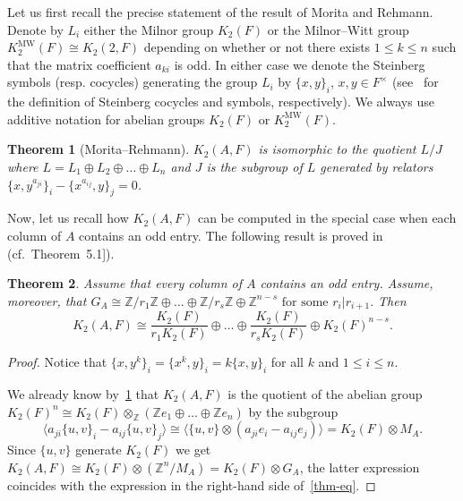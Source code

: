 \documentclass[oneside, 10pt]{amsart}
\theoremstyle{plain}
\newtheorem{thm}{Theorem}
\theoremstyle{remark}
\theoremstyle{definition}
\newcommand{\K}{K_2}
\newcommand{\Kmw}{K^{\mathrm{MW}}_2}
\begin{document}
Let us first recall the precise statement of the result of Morita and Rehmann.
Denote by $L_i$ either the Milnor group $\K(F)$ or the Milnor--Witt group $\Kmw(F)\cong K_2(2, F)$ 
 depending on whether or not there exists $1 \leq k \leq n$ such that the matrix coefficient $a_{ki}$ is odd.
In either case we denote the Steinberg symbols (resp. cocycles) generating the group $L_i$ by $\{x,y\}_i$, $x, y\in F^\times$
 (see~\cite[Proposition~5.5, Lemme~5.6]{Ma} for the definition of Steinberg cocycles and symbols, respectively).
We always use additive notation for abelian groups $\K(F)$ or $\Kmw(F)$.
 
\begin{thm}[Morita--Rehmann] \label{thm:mr} 
 $\K(A, F)$ is isomorphic to the quotient $L/J$ where $L = L_1 \oplus L_2 \oplus \ldots \oplus L_n$ and 
 $J$ is the subgroup of $L$ generated by relators $\{x, y^{a_{ji}}\}_i - \{x^{a_{ij}}, y\}_j = 0$.
\end{thm}

Now, let us recall how $\K(A, F)$ can be computed in the special case when each column of $A$ contains an odd entry.
The following result is proved in~\cite{MW} (cf.~Theorem~5.1]).
\begin{thm} \label{thm-odd}
  Assume that every column of $A$ contains an odd entry. Assume, moreover, that
  $G_A \cong \mathbb{Z}/r_1\mathbb{Z} \oplus \ldots \oplus \mathbb{Z}/r_s\mathbb{Z} \oplus \mathbb{Z}^{n-s}\text{ for some } r_i | r_{i+1}.$
  Then 
  \begin{equation} \label{thm-eq}
    \K(A, F) \cong \frac{\K(F)}{r_1 \K(F)} \oplus \ldots \oplus \frac{\K(F)}{r_s \K(F)} \oplus \K(F)^{n-s}.
  \end{equation}
\end{thm}
\begin{proof}
 Notice that $\{x, y^k\}_i = \{x^k, y\}_i = k\{x,y\}_i$ for all $k$ and $1\leq i\leq n$.
 
 We already know by~\cref{thm:mr} that $\K(A, F)$ is the quotient of the abelian group 
  $\K(F)^n \cong \K(F) \otimes_{\mathbb{Z}} (\mathbb{Z}e_1 \oplus \ldots \oplus \mathbb{Z}e_n)$ by the subgroup
  \[\langle a_{ji}\{u, v\}_i - a_{ij}\{u, v\}_j \rangle \cong \langle \{u, v\} \otimes (a_{ji} e_i - a_{ij} e_j)\rangle = \K(F) \otimes M_A. \]
 Since $\{u, v\}$ generate $\K(F)$ we get $\K(A, F) \cong \K(F) \otimes (\mathbb{Z}^n / M_A) = \K(F) \otimes G_A$,
  the latter expression coincides with the expression in the right-hand side of~\eqref{thm-eq}. 
\end{proof}
\end{document}
